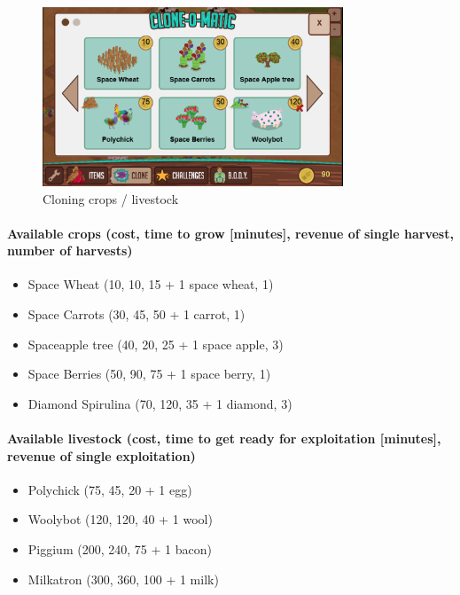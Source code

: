 \begin{figure}[h]
	\centering
		\includegraphics[width=0.80\textwidth]{images/cloning.png}
	\caption{Cloning crops / livestock}
	\label{fig:cloning}
\end{figure}

\paragraph{Available crops (cost, time to grow [minutes], revenue of single harvest, number of harvests)}
\begin{itemize}
\item Space Wheat (10, 10, 15 + 1 space wheat, 1)
\item Space Carrots (30, 45, 50 + 1 carrot, 1)
\item Spaceapple tree (40, 20, 25 + 1 space apple, 3)
\item Space Berries (50, 90, 75 + 1 space berry, 1)
\item Diamond Spirulina (70, 120, 35 + 1 diamond, 3)
\end{itemize}
\paragraph{Available livestock (cost, time to get ready for exploitation [minutes], revenue of single exploitation)}
\begin{itemize}
\item Polychick (75, 45, 20 + 1 egg)
\item Woolybot (120, 120, 40 + 1 wool)
\item Piggium (200, 240, 75 + 1 bacon)
\item Milkatron (300, 360, 100 + 1 milk)
\end{itemize}